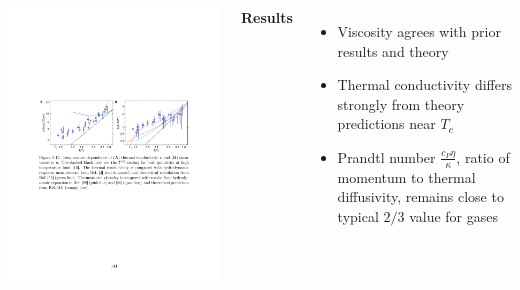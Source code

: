 \documentclass[26pt, paperwidth=36in,paperheight=48in]{tikzposter} %
\newcommand{\myfont}{\fontsize{24}{30}\selectfont}
\begin{document}
\begin{columns}
{		\vspace{-1cm}
		\begin{minipage}{0.48\textwidth}
			\centering
			\includegraphics[width=\textwidth,
			trim=3.2cm 13cm 0cm 8.5cm,clip]{figures/transport.pdf}
		\end{minipage}
	
	
	
	\vspace{-2cm}
	\begin{minipage}{0.16\textwidth}
		\flushleft
		\textbf{Results}
		\vspace{0.5cm}
		\myfont
		\begin{itemize}
			\item Viscosity agrees with prior results and theory
			
			\item Thermal conductivity differs strongly from theory predictions near $T_c$
			
			\item Prandtl number $\frac{c_P \eta}{\kappa}$, ratio of momentum to thermal diffusivity, remains close to typical $2/3$ value for gases 
		\end{itemize}
		

\end{minipage}}
\end{columns}
\end{document}
